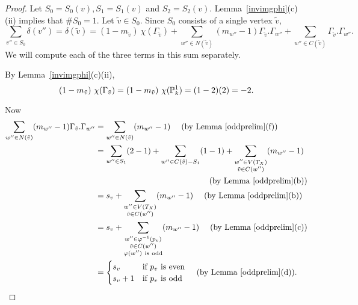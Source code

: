 \begin{proof}
Let $S_0 = S_0(v), S_1 = S_1(v)$ and $S_2 = S_2(v)$. Lemma~\ref{invimgphi}(c)(ii) implies that $\# S_0 = 1$. Let $\tilde{v} \in S_0$. Since $S_0$ consists of a single vertex $\tilde{v}$, 
\[ \sum_{v'' \in S_0} \delta(v'') = \delta(\tilde{v}) = (1-m_{\tilde{v}})\ \chi(\Gamma_{\tilde{v}}) + \sum_{w'' \in N({\tilde{v}})} (m_{w''} - 1) \Gamma_{\tilde{v}}.\Gamma_{w''} + \sum_{w'' \in C({\tilde{v}})} \Gamma_{\tilde{v}}.\Gamma_{w''}  .\]
We will compute each of the three terms in this sum separately.

By Lemma~\ref{invimgphi}(c)(ii), 
\[ (1-m_{\tilde{v}})\ \chi(\Gamma_{\tilde{v}}) = (1-m_{\tilde{v}})\ \chi(\P^1_k) =  (1-2)(2) = -2 .\] 

Now 
\begin{align*}
 \sum_{w'' \in N({\tilde{v}})} (m_{w''} - 1) \Gamma_{\tilde{v}}.\Gamma_{w''}  
 &= \sum_{w'' \in N({\tilde{v}})} (m_{w''} - 1) \ \ \ \ (\mathrm{by \ Lemma~\ref{oddprelim}(f)}) \\
 &= \sum_{w'' \in S_1} (2 - 1) + \sum_{w'' \in C({\tilde{v}}) \setminus S_1} (1 - 1) + {\sum_{\substack{w'' \in V(T_X) \\ \tilde{v} \in C(w'') }}}  (m_{w''} - 1) \\
 & \pushright{(\mathrm{by \ Lemma~\ref{oddprelim}(b)})} \\
 &= s_v + {\sum_{\substack{w'' \in V(T_X) \\ \tilde{v} \in C(w'') }}} (m_{w''} - 1) \ \ \ \ (\mathrm{by \ Lemma~\ref{oddprelim}(b)}) \\
 &= s_v + {\sum_{\substack{w'' \in \phi^{-1}(p_v) \\ \tilde{v} \in C(w'') \\ \phi(w'') \ \mathrm{is \ odd} }}} (m_{w''} - 1) \ \ \ \ (\mathrm{by \ Lemma~\ref{oddprelim}(c)}) \\
 &= {\begin{cases}
      s_v &\textup{if $p_v$ is even} \\
      s_v+1 &\textup{if $p_v$ is odd}
     \end{cases}
}\ \ \ \ (\mathrm{by \ Lemma~\ref{oddprelim}(d)}). 
\end{align*}


\end{proof}
